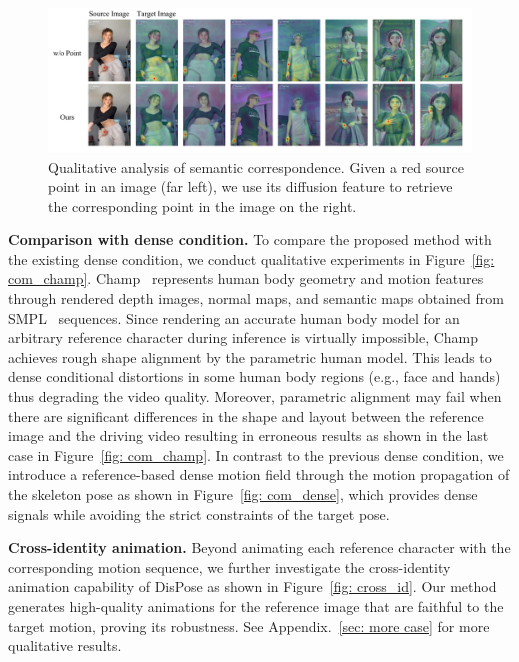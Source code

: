 \begin{figure}[t]
    \centering
    \includegraphics[width=1.0\columnwidth]{./image/cross_vis.pdf}
    \vspace{-20pt}
    \caption{Qualitative analysis of semantic correspondence. Given a red source point in an image (far left), we use its diffusion feature to retrieve the corresponding point in the image on the right.}
    \label{fig: point_abs}
\end{figure}

\textbf{Comparison with dense condition.} To compare the proposed method with the existing dense condition, we conduct qualitative experiments in Figure~\ref{fig: com_champ}. 
Champ~\citep{zhu2024champ} represents human body geometry and motion features through rendered depth images, normal maps, and semantic maps obtained from SMPL~\citep{SMPL:2015} sequences. Since rendering an accurate human body model for an arbitrary reference character during inference is virtually impossible, Champ achieves rough shape alignment by the parametric human model. This leads to dense conditional distortions in some human body regions (e.g., face and hands) thus degrading the video quality. Moreover, parametric alignment may fail when there are significant differences in the shape and layout between the reference image and the driving video resulting in erroneous results as shown in the last case in Figure~\ref{fig: com_champ}. In contrast to the previous dense condition, we introduce a reference-based dense motion field through the motion propagation of the skeleton pose as shown in Figure~\ref{fig: com_dense}, which provides dense signals while avoiding the strict constraints of the target pose.

\textbf{Cross-identity animation.} Beyond animating each reference character with the corresponding motion sequence, we further investigate the cross-identity animation capability of DisPose as shown in Figure~\ref{fig: cross_id}. Our method generates high-quality animations for the reference image that are faithful to the target motion, proving its robustness. See Appendix.~\ref{sec: more case} for more qualitative results.


